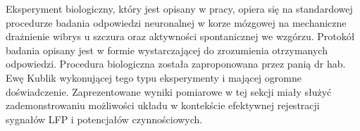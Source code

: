 \begin{frame}[t]

    \begin{block}{\tb}
    \end{block}
    Eksperyment biologiczny, który jest opisany w pracy, opiera się na standardowej procedurze badania odpowiedzi neuronalnej w korze mózgowej na mechaniczne drażnienie wibrys u szczura oraz aktywności spontanicznej we wzgórzu.
    Protokół badania opisany jest w formie  wystarczającej do zrozumienia otrzymanych odpowiedzi.
    Procedura biologiczna została zaproponowana przez panią dr hab. Ewę Kublik wykonującej tego typu eksperymenty i mającej ogromne doświadczenie.
    Zaprezentowane wyniki pomiarowe w tej sekcji miały służyć zademonstrowaniu możliwości układu w kontekście efektywnej rejestracji sygnałów LFP i potencjałów czynnościowych.
\end{frame}


